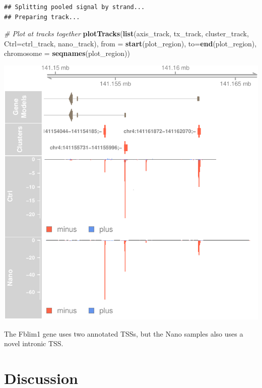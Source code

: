 \documentclass[9pt,a4paper,]{extarticle}
\newenvironment{Shaded}{\begin{snugshade}}{\end{snugshade}}
\newcommand{\KeywordTok}[1]{\textcolor[rgb]{0.13,0.29,0.53}{\textbf{{#1}}}}
\newcommand{\DataTypeTok}[1]{\textcolor[rgb]{0.13,0.29,0.53}{{#1}}}
\newcommand{\CommentTok}[1]{\textcolor[rgb]{0.56,0.35,0.01}{\textit{{#1}}}}
\newcommand{\NormalTok}[1]{{#1}}
\begin{document}
\begin{verbatim}
## Splitting pooled signal by strand...
## Preparing track...
\end{verbatim}

\begin{Shaded}
\begin{Highlighting}[]
\CommentTok{# Plot at tracks together}
\KeywordTok{plotTracks}\NormalTok{(}\KeywordTok{list}\NormalTok{(axis_track, }
                \NormalTok{tx_track, }
                \NormalTok{cluster_track, }
                \DataTypeTok{Ctrl=}\NormalTok{ctrl_track, }
                \NormalTok{nano_track),}
           \DataTypeTok{from =} \KeywordTok{start}\NormalTok{(plot_region), }
           \DataTypeTok{to=}\KeywordTok{end}\NormalTok{(plot_region), }
           \DataTypeTok{chromosome =} \KeywordTok{seqnames}\NormalTok{(plot_region))}
\end{Highlighting}
\end{Shaded}

\begin{center}\includegraphics{CAGEWorkflow_files/figure-latex/dtubrowser-1} \end{center}

The Fblim1 gene uses two annotated TSSs, but the Nano samples also uses a novel intronic TSS.

\section{Discussion}\label{discussion}
\end{document}
